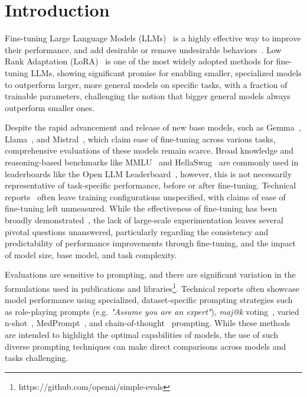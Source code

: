 \section{Introduction}

Fine-tuning Large Language Models (LLMs)~\cite{67minaee2024survey, 52stanfordOpportunitiesRisks} is a highly effective way to improve their performance, and add desirable or remove undesirable behaviors~\cite{2ouyang2022training, 13houlsby2019peft, 16howard2018finetuning, 17peters2019finetuning}. Low Rank Adaptation (LoRA)~\cite{1hu2021lora} is one of the most widely adopted methods for fine-tuning LLMs, showing significant promise for enabling smaller, specialized models to outperform larger, more general models on specific tasks, with a fraction of trainable parameters, challenging the notion that bigger general models always outperform smaller ones.

Despite the rapid advancement and release of new base models, such as Gemma~\cite{3gemma}, Llama~\cite{4llama}, and Mistral~\cite{5mistral}, which claim ease of fine-tuning across various tasks, comprehensive evaluations of these models remain scarce. Broad knowledge and reasoning-based benchmarks like MMLU~\cite{28hendrycks2020mmlu} and HellaSwag~\cite{29zellers2019zellers} are commonly used in leaderboards like the Open LLM Leaderboard~\cite{34open-llm-leaderboard}, however, this is not necessarily representative of task-specific performance, before or after fine-tuning. Technical reports~\cite{3gemma, 4llama, 5mistral, 35gpt4, 32gemini} often leave training configurations unspecified, with claims of ease of fine-tuning left unmeasured. While the effectiveness of fine-tuning has been broadly demonstrated~\cite{9kohut2023finetuning, 10zheng2024}, the lack of large-scale experimentation leaves several pivotal questions unanswered, particularly regarding the consistency and predictability of performance improvements through fine-tuning, and the impact of model size, base model, and task complexity.

Evaluations are sensitive to prompting, and there are significant variation in the formulations used in publications and libraries\footnote{https://github.com/openai/simple-evals}. Technical reports often showcase model performance using specialized, dataset-specific prompting strategies such as role-playing prompts (e.g. \textit{"Assume you are an expert"}), \textit{maj@k} voting~\cite{48wangselfconsistency}, varied n-shot~\cite{37song2022evalsurvey}, MedPrompt~\cite{33nori2023generalistvsfinetuned}, and chain-of-thought~\cite{36wei2022cot} prompting. While these methods are intended to highlight the optimal capabilities of models, the use of such diverse prompting techniques can make direct comparisons across models and tasks challenging.

